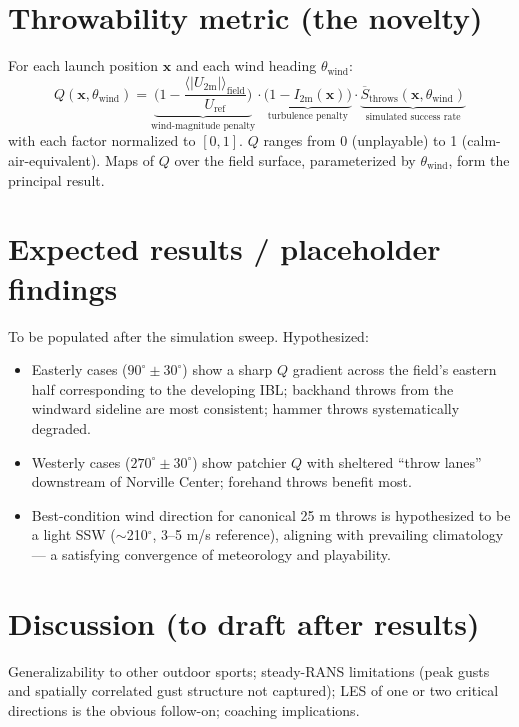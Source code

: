 \documentclass[11pt,letterpaper]{article}
\begin{document}
\section{Throwability metric (the novelty)}
\label{sec:throwability}

For each launch position $\mathbf{x}$ and each wind heading $\theta_{\text{wind}}$:
\begin{equation}
Q(\mathbf{x}, \theta_{\text{wind}}) =
\underbrace{\Big(1 - \frac{\langle |U_{2\text{m}}| \rangle_{\text{field}}}{U_{\text{ref}}}\Big)}_{\text{wind-magnitude penalty}}
\cdot
\underbrace{\big(1 - I_{2\text{m}}(\mathbf{x})\big)}_{\text{turbulence penalty}}
\cdot
\underbrace{\overline{S}_{\text{throws}}(\mathbf{x}, \theta_{\text{wind}})}_{\text{simulated success rate}}
\end{equation}
with each factor normalized to $[0, 1]$. $Q$ ranges from 0 (unplayable) to 1 (calm-air-equivalent). Maps of $Q$ over the field surface, parameterized by $\theta_{\text{wind}}$, form the principal result.

\section{Expected results / placeholder findings}

To be populated after the simulation sweep. Hypothesized:
\begin{itemize}[leftmargin=*,itemsep=2pt]
  \item Easterly cases ($90^\circ \pm 30^\circ$) show a sharp $Q$ gradient across the field's eastern half corresponding to the developing IBL; backhand throws from the windward sideline are most consistent; hammer throws systematically degraded.
  \item Westerly cases ($270^\circ \pm 30^\circ$) show patchier $Q$ with sheltered ``throw lanes'' downstream of Norville Center; forehand throws benefit most.
  \item Best-condition wind direction for canonical 25 m throws is hypothesized to be a light SSW ($\sim$210$^\circ$, 3--5 m/s reference), aligning with prevailing climatology --- a satisfying convergence of meteorology and playability.
\end{itemize}

\section{Discussion (to draft after results)}

Generalizability to other outdoor sports; steady-RANS limitations (peak gusts and spatially correlated gust structure not captured); LES of one or two critical directions is the obvious follow-on; coaching implications.
\end{document}
